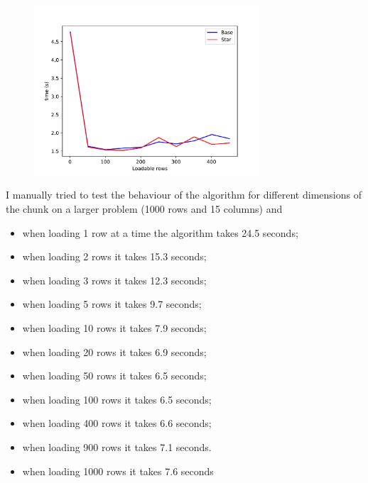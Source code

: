 \documentclass{beamer}
\begin{document}
\begin{frame}
    \begin{figure}
        \centering
        \includegraphics[width=0.75\textwidth]{loadable_rows_time_diff_rev.pdf}
        \label{fig:load_portions_b}
    \end{figure}
\end{frame}

\begin{frame}
I manually tried to test the behaviour of the algorithm for
different dimensions of the chunk on a larger problem (1000 rows
and 15 columns) and 
\begin{itemize}
    \item when loading 1 row at a time the algorithm takes 24.5 seconds;
    \item when loading 2 rows it takes 15.3 seconds;
    \item when loading 3 rows it takes 12.3 seconds;
    \item when loading 5 rows it takes 9.7 seconds;
    \item when loading 10 rows it takes 7.9 seconds;
    \item when loading 20 rows it takes 6.9 seconds;
    \item when loading 50 rows it takes 6.5 seconds;
    \item when loading 100 rows it takes 6.5 seconds;
    \item when loading 400 rows it takes 6.6 seconds;
    \item when loading 900 rows it takes 7.1 seconds.
    \item when loading 1000 rows it takes 7.6 seconds
\end{itemize}
\end{frame}
\end{document}
